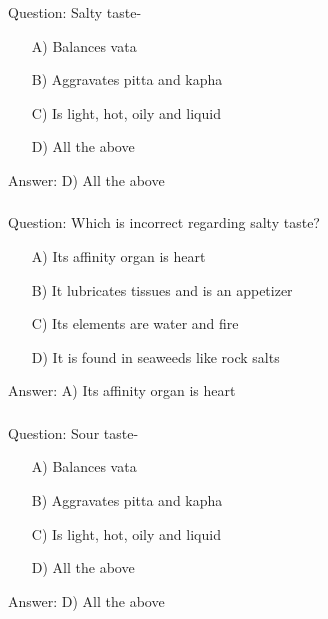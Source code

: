 \begin{frame}[fragile]\frametitle{}

Question: Salty taste-

\begin{itemize}
\item[A)] Balances vata
\item[B)] Aggravates pitta and kapha
\item[C)] Is light, hot, oily and liquid
\item[D)] All the above
\end{itemize}

Answer: D) All the above
\end{frame}

\begin{frame}[fragile]\frametitle{}

Question: Which is incorrect regarding salty taste?

\begin{itemize}
\item[A)] Its affinity organ is heart
\item[B)] It lubricates tissues and is an appetizer
\item[C)] Its elements are water and fire
\item[D)] It is found in seaweeds like rock salts
\end{itemize}

Answer: A) Its affinity organ is heart
\end{frame}

\begin{frame}[fragile]\frametitle{}

Question: Sour taste-

\begin{itemize}
\item[A)] Balances vata
\item[B)] Aggravates pitta and kapha
\item[C)] Is light, hot, oily and liquid
\item[D)] All the above
\end{itemize}

Answer: D) All the above
\end{frame}

